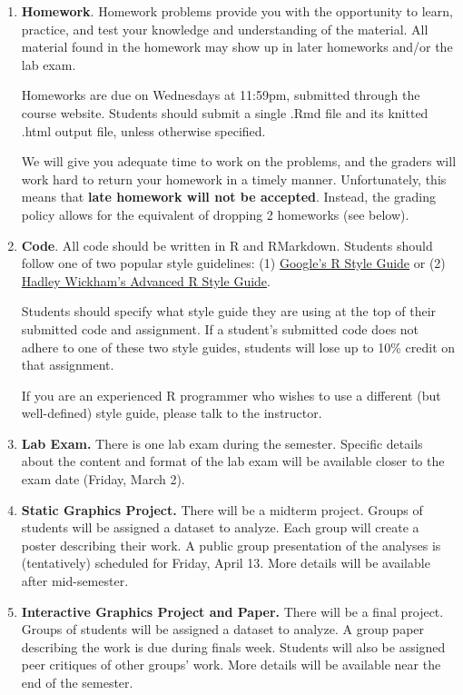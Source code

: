 \documentclass[11pt]{article}
\begin{document}
\begin{enumerate}
\item {\bf Homework}. 
Homework problems provide you with the opportunity to learn, practice, and test your knowledge and understanding of the material.  All material found in the homework may show up in later homeworks and/or the lab exam.

Homeworks are due on Wednesdays at 11:59pm, submitted through the course website.  Students should submit a single .Rmd file and its knitted .html output file, unless otherwise specified.

We will give you adequate time to work on the problems, and the graders will work hard to return your homework in a timely manner. Unfortunately, this means that {\bf late homework will not be accepted}. Instead, the grading policy allows for the equivalent of dropping 2 homeworks (see below).


\item {\bf Code}.  All code should be written in R and RMarkdown.  Students should follow one of two popular style guidelines:  (1) \href{https://google.github.io/styleguide/Rguide.xml}{Google's R Style Guide} or (2) \href{http://adv-r.had.co.nz/Style.html}{Hadley Wickham's Advanced R Style Guide}.

Students should specify what style guide they are using at the top of their submitted code and assignment.  If a student's submitted code does not adhere to one of these two style guides, students will lose up to 10\% credit on that assignment.

If you are an experienced R programmer who wishes to use a different (but well-defined) style guide, please talk to the instructor.  


\item {\bf Lab Exam.} There is one lab exam during the semester.  Specific details about the content and format of the lab exam will be available closer to the exam date (Friday, March 2).


\item {\bf Static Graphics Project.} There will be a midterm project.  Groups of students will be assigned a dataset to analyze.  Each group will create a poster describing their work.  A public group presentation of the analyses is (tentatively) scheduled for Friday, April 13.  More details will be available after mid-semester.

\item {\bf Interactive Graphics Project and Paper.} There will be a final project.  Groups of students will be assigned a dataset to analyze.  A group paper describing the work is due during finals week. Students will also be assigned peer critiques of other groups' work.  More details will be available near the end of the semester.

\end{enumerate}
\end{document}
